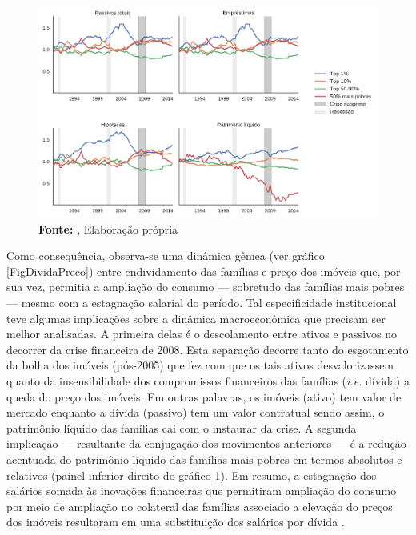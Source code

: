\begin{figure}[H]
	\centering
	\caption{Distribuição de passivos por percentil de riqueza (1989/07=1)}
	\label{FigDistPassivos}
	\includegraphics[width=\textwidth]{../../Dados/Fatos_Estilizados/figs/Distribuicao_Passivos.png}
	\caption*{\textbf{Fonte:} \textcite{us_census_bureau_characteristics_2017}, Elaboração própria}
\end{figure}


Como consequência, observa-se uma dinâmica gêmea (ver gráfico \ref{FigDividaPreco}) entre endividamento das famílias e preço dos imóveis que, por sua vez, permitia a ampliação do consumo --- sobretudo das famílias mais pobres --- mesmo com a estagnação salarial do período.
Tal especificidade institucional teve algumas implicações sobre a dinâmica macroeconômica que precisam ser melhor analisadas.
A primeira delas é o descolamento entre ativos e passivos no decorrer da crise financeira de 2008.
Esta separação decorre tanto do esgotamento da bolha dos imóveis (pós-2005) que fez com que os tais ativos desvalorizassem quanto da insensibilidade dos compromissos financeiros das famílias (\textit{i.e.} dívida) a queda do preço dos imóveis.
Em outras palavras, os imóveis (ativo) tem valor de mercado enquanto a dívida (passivo) tem um valor contratual sendo assim, o patrimônio líquido das famílias cai com o instaurar da crise.
A segunda implicação --- resultante da conjugação dos movimentos anteriores --- é a redução acentuada do patrimônio líquido das famílias mais pobres em termos absolutos e relativos (painel inferior direito do gráfico \ref{FigDistPassivos}).
Em resumo, a estagnação dos salários somada às inovações financeiras que permitiram ampliação do consumo por meio de ampliação no colateral das famílias associado a elevação do preços dos imóveis resultaram em uma substituição dos salários por dívida \cite{barba_rising_2009}.


